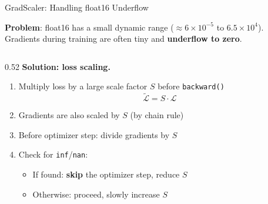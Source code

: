 \begin{frame}{GradScaler: Handling float16 Underflow}

  \textbf{Problem}: float16 has a small dynamic range ($\approx 6 \times 10^{-5}$ to $6.5 \times 10^4$). Gradients during training are often tiny and \textbf{underflow to zero}.

  \vspace{0.5em}
  \begin{columns}
    \begin{column}{0.52\textwidth}
      \textbf{Solution: loss scaling.}
      \begin{enumerate}
        \item Multiply loss by a large scale factor $S$ before \texttt{backward()}
          \[ \tilde{\mathcal{L}} = S \cdot \mathcal{L} \]
        \item Gradients are also scaled by $S$ (by chain rule)
        \item Before optimizer step: divide gradients by $S$
        \item Check for \texttt{inf}/\texttt{nan}:
          \begin{itemize}
            \item If found: \textbf{skip} the optimizer step, reduce $S$
            \item Otherwise: proceed, slowly increase $S$
          \end{itemize}
      \end{enumerate}


\end{column}
\end{columns}
\end{frame}
